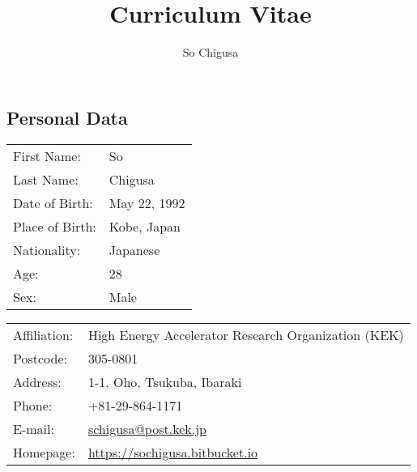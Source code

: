 \documentclass[12pt]{article}
\title{\vspace{-2cm}\textbf{Curriculum Vitae}}
\author{So Chigusa}
\begin{document}
\large
\maketitle

\newcommand{\lsim}{\stackrel{<}{_\sim}}
\newcommand{\gsim}{\stackrel{>}{_\sim}}

\newcommand{\rem}[1]{{$\spadesuit$\bf #1$\spadesuit$}}


\renewcommand{\thefootnote}{\arabic{footnote})}
\setcounter{footnote}{0}

\vspace{-5mm}
\subsection*{Personal Data}

\vspace{-3mm}

\begin{table}[h]
 \begin{tabular}{ll}
  First Name: & So %
      \\
  Last Name: & Chigusa %
      \\
  Date of Birth: & May 22, 1992 \\
  Place of Birth: & Kobe, Japan \\
  Nationality: & Japanese \\
  Age: & 28 \\
  Sex: & Male \\
 \end{tabular}
\end{table}

\vspace{-5mm}
\begin{table}[h]
 \begin{tabular}{ll}
  Affiliation: & High Energy Accelerator Research Organization (KEK) \\
  Postcode: & 305-0801 \\
  Address: & 1-1, Oho, Tsukuba, Ibaraki \\
  Phone: & +81-29-864-1171 \\
  E-mail: &
      \href{mailto:schigusa@post.kek.jp}{schigusa@post.kek.jp}
      \\
  Homepage: & \url{https://sochigusa.bitbucket.io} \\
 \end{tabular}
\end{table}
\vspace{-5mm}
\end{document}

